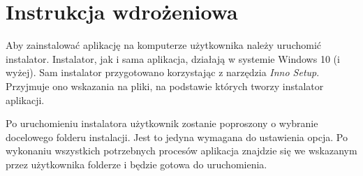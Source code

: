 \chapter{Instrukcja wdrożeniowa}

Aby zainstalować aplikację na komputerze użytkownika należy uruchomić instalator. Instalator, jak i sama aplikacja, działają w systemie Windows 10 (i wyżej). Sam instalator przygotowano korzystając z narzędzia \emph{Inno Setup}. Przyjmuje ono wskazania na pliki, na podstawie których tworzy instalator aplikacji. 


Po uruchomieniu instalatora użytkownik zostanie poproszony o wybranie docelowego folderu instalacji. Jest to jedyna wymagana do ustawienia opcja. Po wykonaniu wszystkich potrzebnych procesów aplikacja znajdzie się we wskazanym przez użytkownika folderze i będzie gotowa do uruchomienia.
